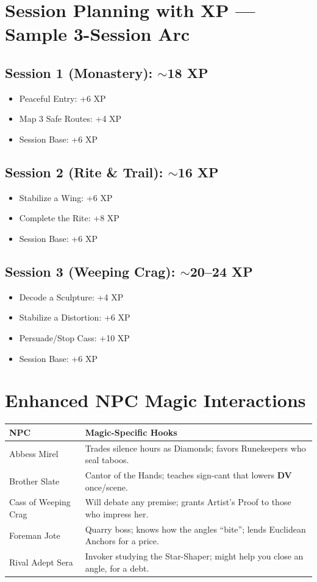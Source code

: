\documentclass[11pt]{article}
\newcommand{\Term}[1]{\textbf{#1}}
\newcommand{\DV}{\Term{DV}}
\begin{document}
\section{Session Planning with XP --- Sample 3-Session Arc}
\label{app:sessions}
\subsection*{Session 1 (Monastery): $\sim$18 XP}
\begin{itemize}
\item Peaceful Entry: +6 XP
\item Map 3 Safe Routes: +4 XP
\item Session Base: +6 XP
\end{itemize}

\subsection*{Session 2 (Rite \& Trail): $\sim$16 XP}
\begin{itemize}
\item Stabilize a Wing: +6 XP
\item Complete the Rite: +8 XP
\item Session Base: +6 XP
\end{itemize}

\subsection*{Session 3 (Weeping Crag): $\sim$20--24 XP}
\begin{itemize}
\item Decode a Sculpture: +4 XP
\item Stabilize a Distortion: +6 XP
\item Persuade/Stop Cass: +10 XP
\item Session Base: +6 XP
\end{itemize}

\section{Enhanced NPC Magic Interactions}
\label{app:npc}
\begin{tabularx}{\linewidth}{@{}l X@{}}
\toprule
\textbf{NPC} & \textbf{Magic-Specific Hooks}\\
\midrule
Abbess Mirel & Trades silence hours as Diamonds; favors Runekeepers who seal taboos.\\
Brother Slate & Cantor of the Hands; teaches sign-cant that lowers \DV{} once/scene.\\
Cass of Weeping Crag & Will debate any premise; grants Artist's Proof to those who impress her.\\
Foreman Jote & Quarry boss; knows how the angles ``bite''; lends Euclidean Anchors for a price.\\
Rival Adept Sera & Invoker studying the Star-Shaper; might help you close an angle, for a debt.\\
\bottomrule
\end{tabularx}
\end{document}
